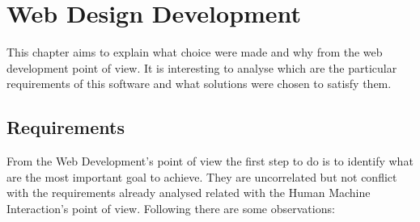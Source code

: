 
\chapter{Web Design Development} %

\label{Chapter 9} %


This chapter aims to explain what choice were made and why from the web development point of view. It is interesting to analyse which are the particular requirements of this software and what solutions were chosen to satisfy them. 

\section{Requirements}

From the Web Development's point of view the first step to do is to identify what are the most important goal to achieve. They are uncorrelated but not conflict with the requirements already analysed related with the Human Machine Interaction's point of view. Following there are some observations:

